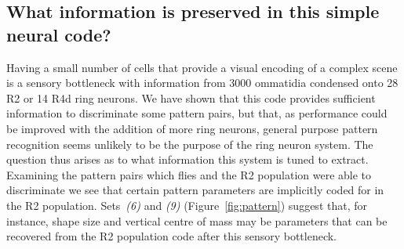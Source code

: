 \subsection*{What information is preserved in this simple neural code?}
Having a small number of cells that provide a visual encoding of a complex scene is a sensory bottleneck with information from 3000 ommatidia condensed onto 28 R2 or 14 R4d ring neurons. We have shown that this code provides sufficient information to discriminate some pattern pairs, but that, as performance could be improved with the addition of more ring neurons, general purpose pattern recognition seems unlikely to be the purpose of the ring neuron system. The question thus arises as to what information this system is tuned to extract. Examining the pattern pairs which flies and the R2 population were able to discriminate we see that certain pattern parameters are implicitly coded for in the R2 population. Sets~\emph{(6)} and \emph{(9)} (Figure~\ref{fig:pattern}) suggest that, for instance, shape size and vertical centre of mass may be parameters that can be recovered from the R2 population code after this sensory bottleneck.


